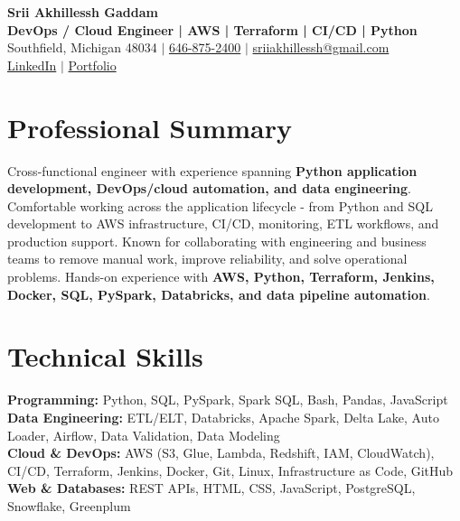 \documentclass[letterpaper,10pt]{article}
\begin{document}
\fontsize{9.35pt}{10.45pt}\selectfont

\begin{center}
    {\LARGE \textbf{Srii Akhillessh Gaddam}} \\[-1pt]
    \textbf{DevOps / Cloud Engineer | AWS | Terraform | CI/CD | Python} \\[2pt]
    Southfield, Michigan 48034 $|$
    \href{tel:6468752400}{646-875-2400} $|$
    \href{mailto:sriiakhillessh@gmail.com}{sriiakhillessh@gmail.com} \\[1pt]
    \href{https://www.linkedin.com/in/srii-akhiilessh-gaddam-b48668191/}{LinkedIn} $|$
    \href{https://sriiakhillesshg.github.io/portfolio/}{Portfolio}
\end{center}
\vspace{-8pt}

\section{Professional Summary}
\small{Cross-functional engineer with experience spanning \textbf{Python application development, DevOps/cloud automation, and data engineering}. Comfortable working across the application lifecycle - from Python and SQL development to AWS infrastructure, CI/CD, monitoring, ETL workflows, and production support. Known for collaborating with engineering and business teams to remove manual work, improve reliability, and solve operational problems. Hands-on experience with \textbf{AWS, Python, Terraform, Jenkins, Docker, SQL, PySpark, Databricks, and data pipeline automation}.}

\section{Technical Skills}
\small{
\textbf{Programming:} Python, SQL, PySpark, Spark SQL, Bash, Pandas, JavaScript \\
\textbf{Data Engineering:} ETL/ELT, Databricks, Apache Spark, Delta Lake, Auto Loader, Airflow, Data Validation, Data Modeling \\
\textbf{Cloud \& DevOps:} AWS (S3, Glue, Lambda, Redshift, IAM, CloudWatch), CI/CD, Terraform, Jenkins, Docker, Git, Linux, Infrastructure as Code, GitHub \\
\textbf{Web \& Databases:} REST APIs, HTML, CSS, JavaScript, PostgreSQL, Snowflake, Greenplum
}
\end{document}

